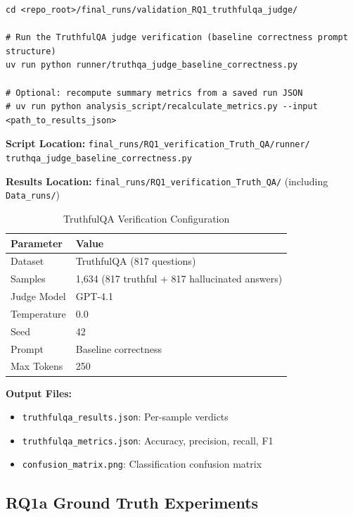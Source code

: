 \begin{verbatim}
cd <repo_root>/final_runs/validation_RQ1_truthfulqa_judge/

# Run the TruthfulQA judge verification (baseline correctness prompt structure)
uv run python runner/truthqa_judge_baseline_correctness.py

# Optional: recompute summary metrics from a saved run JSON
# uv run python analysis_script/recalculate_metrics.py --input <path_to_results_json>
\end{verbatim}

\textbf{Script Location:} \texttt{final\_runs/RQ1\_verification\_Truth\_QA/runner/} \texttt{truthqa\_judge\_baseline\_correctness.py}

\textbf{Results Location:} \texttt{final\_runs/RQ1\_verification\_Truth\_QA/} (including \texttt{Data\_runs/})

\begin{table}[H]
\centering
\caption{TruthfulQA Verification Configuration}
\label{tab:truthqa_config}
\footnotesize
\begin{tabular}{@{}ll@{}}
\toprule
\textbf{Parameter} & \textbf{Value} \\
\midrule
Dataset & TruthfulQA (817 questions) \\
Samples & 1,634 (817 truthful + 817 hallucinated answers) \\
Judge Model & GPT-4.1 \\
Temperature & 0.0 \\
Seed & 42 \\
Prompt & Baseline correctness \\
Max Tokens & 250 \\
\bottomrule
\end{tabular}
\end{table}

\textbf{Output Files:}
\begin{itemize}[noitemsep]
    \item \texttt{truthfulqa\_results.json}: Per-sample verdicts
    \item \texttt{truthfulqa\_metrics.json}: Accuracy, precision, recall, F1
    \item \texttt{confusion\_matrix.png}: Classification confusion matrix
\end{itemize}

\subsection{RQ1a Ground Truth Experiments}
\label{sec:rq1a_execution}

